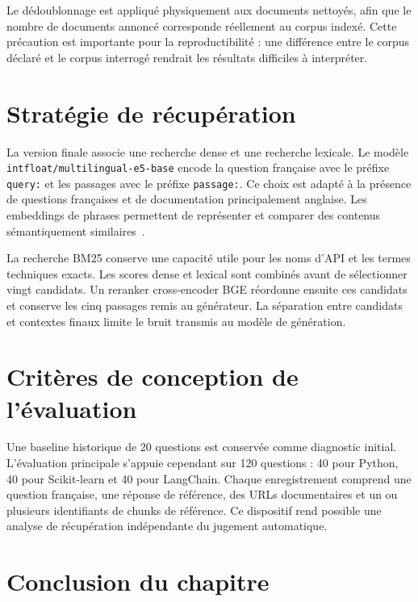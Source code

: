 \documentclass[12pt,a4paper,oneside]{report}
\begin{document}
Le dédoublonnage est appliqué physiquement aux documents nettoyés, afin que le
nombre de documents annoncé corresponde réellement au corpus indexé. Cette
précaution est importante pour la reproductibilité : une différence entre le
corpus déclaré et le corpus interrogé rendrait les résultats difficiles à
interpréter.

\section{Stratégie de récupération}

La version finale associe une recherche dense et une recherche lexicale. Le
modèle \texttt{intfloat/\allowbreak multilingual-e5-\allowbreak base} encode la question française avec
le préfixe \texttt{query:} et les passages avec le préfixe \texttt{passage:}.
Ce choix est adapté à la présence de questions françaises et de documentation
principalement anglaise. Les embeddings de phrases permettent de représenter et
comparer des contenus sémantiquement similaires~\cite{reimers2019sbert,wange5}.

La recherche BM25 conserve une capacité utile pour les noms d'API et les termes
techniques exacts. Les scores dense et lexical sont combinés avant de sélectionner
vingt candidats. Un reranker cross-encoder BGE réordonne ensuite ces candidats
et conserve les cinq passages remis au générateur. La séparation entre candidats
et contextes finaux limite le bruit transmis au modèle de génération.

\section{Critères de conception de l'évaluation}

Une baseline historique de 20 questions est conservée comme diagnostic initial.
L'évaluation principale s'appuie cependant sur 120 questions : 40 pour Python,
40 pour Scikit-learn et 40 pour LangChain. Chaque enregistrement comprend une
question française, une réponse de référence, des URLs documentaires et un ou
plusieurs identifiants de chunks de référence. Ce dispositif rend possible une
analyse de récupération indépendante du jugement automatique.

\section*{Conclusion du chapitre}
\end{document}
